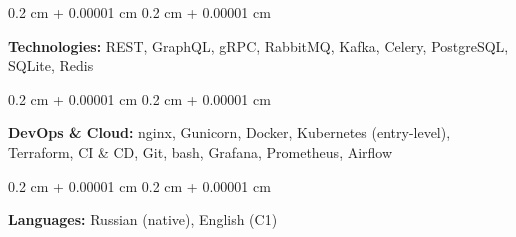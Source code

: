 \documentclass[10pt, letterpaper]{article}
\newenvironment{onecolentry}{
    \begin{adjustwidth}{
        0.2 cm + 0.00001 cm
    }{
        0.2 cm + 0.00001 cm
    }
}{
    \end{adjustwidth}
} %
\begin{document}
        \vspace{0.1 cm}

        \begin{onecolentry}
            \textbf{Technologies:} REST, GraphQL, gRPC, RabbitMQ, Kafka, Celery, PostgreSQL, SQLite, Redis

        \end{onecolentry}

        \vspace{0.1 cm}

        \begin{onecolentry}
            \textbf{DevOps \& Cloud:}  nginx, Gunicorn, Docker, Kubernetes (entry-level), Terraform, CI \& CD, Git, bash, Grafana, Prometheus, Airflow
        \end{onecolentry}

        \vspace{0.1 cm}

        \begin{onecolentry}
            \textbf{Languages:} Russian (native), English (C1)
        \end{onecolentry}
\end{document}
